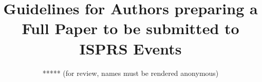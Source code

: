 \documentclass{isprs} %
\begin{document}
\title{Guidelines for Authors preparing a Full Paper to be submitted to ISPRS Events}
\date{}



\author{***** (for review, names must be rendered anonymous)}

\address{**** (for review, affiliations must be rendered anonymous)}


\end{document}
